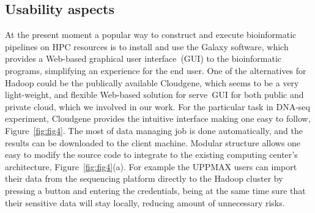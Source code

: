 \documentclass[11pt, oneside]{article}   	%
\begin{document}
\subsection{Usability aspects}
\label{subsectionIV_2}

At the present moment a popular way to construct and execute bioinformatic pipelines on HPC resources  is to install and use the Galaxy\cite{galaxy} software, which provides a Web-based graphical user interface~(GUI) to the bioinformatic programs, simplifying an experience for the end user. 
One of the alternatives for Hadoop could be the publically available Cloudgene\cite{cloudgene}, which seems to be a very light-weight, and flexible Web-based solution for serve~GUI for both public and private cloud, which we involved in our work.
For the particular task in DNA-seq experiment, Cloudgene provides the intuitive interface making one easy to follow, Figure~\ref{fig:fig4}. The most of data managing job is done automatically, and the results can be downloaded to the client machine. Modular structure allows one easy to modify the source code to integrate to the existing computing center’s architecture, Figure~\ref{fig:fig4}(a). For example the UPPMAX users can import their data from the sequencing platform directly to the Hadoop cluster by pressing a button and entering the credentials, being at the same time sure that their sensitive data will stay locally, reducing amount of unnecessary risks.
\end{document}
